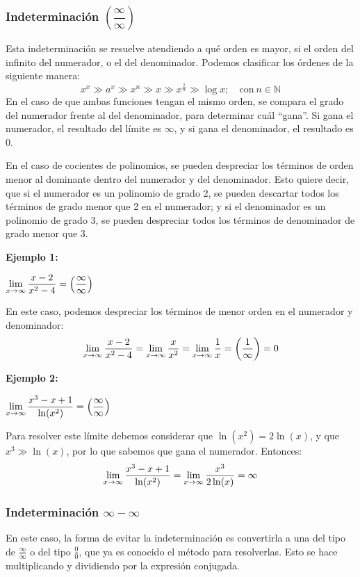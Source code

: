 \documentclass[sans]{apuntes}
\begin{document}
\subsubsection{Indeterminación \texorpdfstring{$\left(\dfrac{\infty}{\infty}\right)$}{(∞/∞)}}
Esta indeterminación se resuelve atendiendo a qué orden es mayor, si el orden del infinito del numerador, o el del denominador. Podemos clasificar los órdenes de la siguiente manera:
\[x^x \gg a^x \gg x^n \gg x \gg x^{\frac1{n}} \gg \log{x};\quad \text{con}\ n \in \mathbb{N}\]
En el caso de que ambas funciones tengan el mismo orden, se compara el grado del numerador frente al del denominador, para determinar cuál ``gana''. Si gana el numerador, el resultado del límite es $\infty$, y si gana el denominador, el resultado es 0.
\par En el caso de cocientes de polinomios, se pueden despreciar los términos de orden menor al dominante dentro del numerador y del denominador. Esto quiere decir, que si el numerador es un polinomio de grado 2, se pueden descartar todos los términos de grado menor que 2 en el numerador; y si el denominador es un polinomio de grado 3, se pueden despreciar todos los términos de denominador de grado menor que 3.

\begin{examplebox}
	\textbf{Ejemplo 1:}
	\par \(\displaystyle\lim_{x\to \infty}\frac{x - 2}{x^2 - 4} = \left(\frac{\infty}{\infty}\right)\)
	\par En este caso, podemos despreciar los términos de menor orden en el numerador y denominador:
	\[\displaystyle\lim_{x\to \infty}\frac{x - 2}{x^2 - 4} = \displaystyle\lim_{x \to \infty} \frac{x}{x^2} = \displaystyle\lim_{x \to \infty} \frac1{x} = \left(\frac{1}{\infty}\right) = 0\]

	\vspace{2em}
	\textbf{Ejemplo 2:}
	\par \(\displaystyle\lim_{x\to \infty}\frac{x^3 - x + 1}{\ln(x^2)} = \left(\frac{\infty}{\infty}\right)\)
	\par Para resolver este límite debemos considerar que $\ln(x^2) = 2\ln(x)$, y que $x^3 \gg \ln(x)$, por lo que sabemos que gana el numerador. Entonces:
	\[\displaystyle\lim_{x \to \infty}\frac{x^3 - x + 1}{\ln(x^2)} = \displaystyle\lim_{x \to \infty}\frac{x^3}{2\ln(x)} = \infty\]
\end{examplebox}

\subsubsection{Indeterminación \texorpdfstring{$\infty-\infty$}{∞-∞}}
En este caso, la forma de evitar la indeterminación es convertirla a una del tipo de $\frac{\infty}{\infty}$ o del tipo $\frac{0}{0}$, que ya es conocido el método para resolverlas. Esto se hace multiplicando y dividiendo por la expresión conjugada.
\par {}
\end{document}
